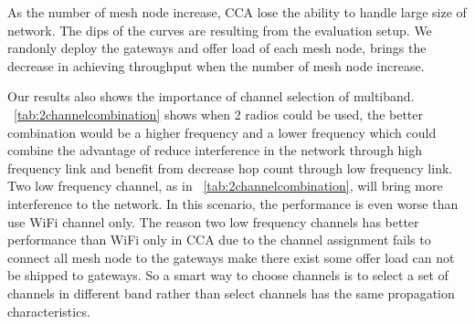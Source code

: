 As the number of mesh node increase, CCA lose the ability to handle large size of network. 
The dips of the curves are resulting from the evaluation setup. 
We randonly deploy the gateways and offer load of each mesh node, brings the decrease in achieving throughput when the number of mesh node increase. 


   Our results also shows the importance of channel selection of multiband. ~\ref{tab:2channelcombination} shows when 2 radios could be used, the better combination would be a higher frequency and a lower frequency which could combine the advantage of reduce interference in the network through high frequency link and benefit from decrease hop count through low frequency link. 
Two low frequency channel, as in ~\ref{tab:2channelcombination}, will bring more interference to the network.
In this scenario, the performance is even worse than use WiFi channel only. 
The reason two low frequency channels has better performance than WiFi only in CCA due to the channel assignment fails to connect all mesh node to the gateways make there exist some offer load can not be shipped to gateways.
So a smart way to choose channels is to select a set of channels in different band rather than select channels has the same propagation characteristics.



